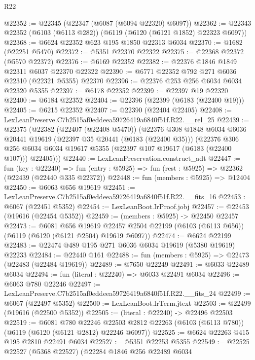 \begin{lexlean}{R22}
\begin{coremodule}
@22352 := @22345 (@22347 (@6087 (@6094 @22320) @6097))
@22362 := @22343 @22352 (@6103 (@6113 @282)) (@6119 (@6120 (@6121 @1852) @22323 @6097))
@22368 := @6624 @22352 @623 @195 @1850 @22313 @6034
@22370 := @1682 (@22251 @5470)
@22372 := @5351 @22370 @22322
@22375 := @22368 @22372 (@5570 @22372)
@22376 := @6169 @22352
@22382 := @22376 @1846 @1849 @22311 @6037 @22370 @22322
@22390 := @6771 @22352 @792 @271 @6036 @22310 (@22321 @5355) @22370
@22396 := @22376 @253 @256 @6034 @6034 @22320 @5355
@22397 := @6178 @22352
@22399 := @22397 @19 @22320
@22400 := @6184 @22352
@22404 := @22396 (@22399 (@6183 (@22400 @19)))
@22405 := @6215 @22352
@22407 := @22390 (@22404 @22405)
@22408 := LexLeanPreserve.C7b2515af0eddeea59726419a6840f51f.R22.__rel_25
@22439 := @22375
    (@22382
      (@22407 (@22408 @5470))
      (@22376
        @308
        @1848
        @6034
        @6036
        @20441
        @19619
        (@22397 @35 @20441 (@6183 (@22400 @35)))
        (@22376
          @306
          @256
          @6034
          @6034
          @19617
          @5355
          (@22397 @107 @19617 (@6183 (@22400 @107)))
          @22405)))
@22440 := LexLeanPreservation.construct_adt
@22447 := fun (key : @22240) =>
  fun (entry : @5925) => fun (rest : @5925) => @22362 (@22439 (@22440 @335 @22372))
@22448 := fun (members : @5925) => @12404
@22450 := @6063 @656 @19619
@22451 := LexLeanPreserve.C7b2515af0eddeea59726419a6840f51f.R22.__fits_16
@22453 := @6067 (@22451 @5352)
@22454 := LexLeanBoot.IrProof.jobj
@22457 := @22453 (@19616 (@22454 @5352))
@22459 := (members : @5925) -> @22450 @22457
@22473 := @6081
    @656
    @19619
    @22457
    @2504
    @22199
    (@6103 (@6113 @656))
    (@6119 (@6120 (@6121 @2504) @19619 @6097))
@22474 := @6624 @22199
@22483 := @22474 @489 @195 @271 @6036 @6034 @19619 (@5380 @19619) @22233
@22484 := @22440 @161
@22488 := fun (members : @5925) => @22473 (@22483 (@22484 @19619))
@22489 := @7650 @22249
@22491 := @6033 @22489 @6034
@22494 := fun (literal : @22240) => @6033 @22491 @6034
@22496 := @6063 @780 @22246
@22497 := LexLeanPreserve.C7b2515af0eddeea59726419a6840f51f.R22.__fits_24
@22499 := @6067 (@22497 @5352)
@22500 := LexLeanBoot.IrTerm.jtext
@22503 := @22499 (@19616 (@22500 @5352))
@22505 := (literal : @22240) -> @22496 @22503
@22519 := @6081
    @780
    @22246
    @22503
    @2812
    @22263
    (@6103 (@6113 @780))
    (@6119 (@6120 (@6121 @2812) @22246 @6097))
@22525 := @6624 @22263 @415 @195 @2810 @22491 @6034
@22527 := @5351 @22253 @5355
@22549 := @22525
    @22527
    (@5368 @22527)
    (@22284
      @1846
      @256
      @22489
      @6034

\end{coremodule}
\end{lexlean}
